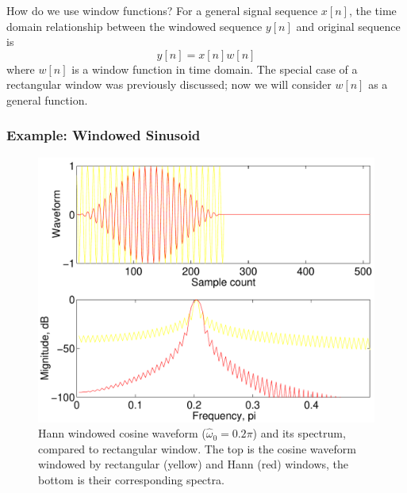 How do we use window functions? For a general signal sequence $x[n]$,
the time domain relationship between the windowed sequence $y[n]$ and
original sequence is
\begin{equation}
y[n] = x[n] w[n]
\label{eq:ufft-gw}
\end{equation}
where $w[n]$ is a window function in time domain. The special case of
a rectangular window was previously discussed; now we will consider
$w[n]$ as a general function.

\subsubsection{Example: Windowed Sinusoid}

\begin{figure}
\centerline{\includegraphics[height=0.35\textheight]{ch-fft/ufft_hannrect_cosx512_256}}
\caption[Hann windowed cosine waveform and its spectrum]{Hann windowed
cosine waveform ($\hat{\omega}_0=0.2\pi$) and its spectrum, compared to
rectangular window. The top is the cosine waveform windowed by
rectangular (yellow) and Hann (red) windows, the bottom is their
corresponding spectra.\label{fig:ufft-hnrt-cosx}}
\end{figure}

